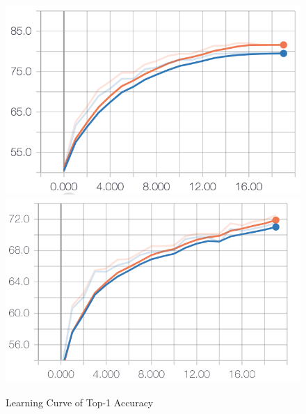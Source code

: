 \documentclass{article}
\begin{document}
\begin{figure}[h]
  \centering
  \includegraphics[scale=0.7]{top_1_acc_sc.png}
  \includegraphics[scale=0.7]{top_1_acc_pre.png}
  \caption{Learning Curve of Top-1 Accuracy}
\end{figure}

\pagebreak
\end{document}
